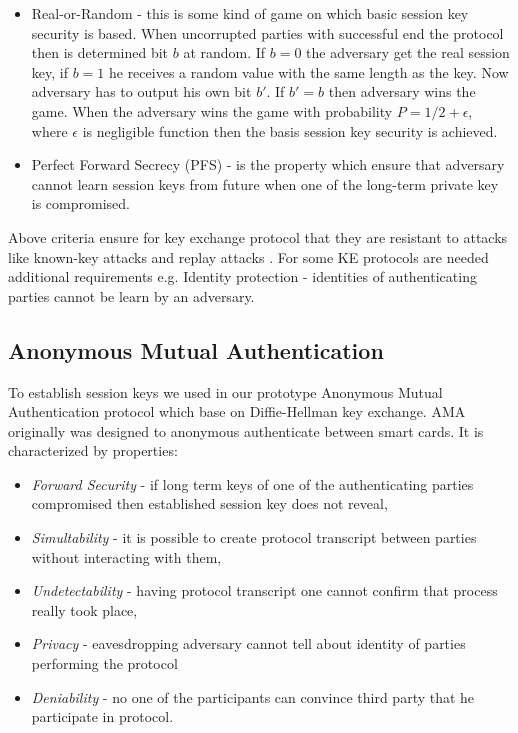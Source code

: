 \documentclass[11pt,titlepage]{article}
\theoremstyle{plain}
\begin{document}
\begin{itemize}
	\item Real-or-Random - this is some kind of game on which basic session key security is based. When uncorrupted parties with successful end the protocol then is determined bit $b$ at random. If $b=0$ the adversary get the real session key, if $b = 1$ he receives a random value with the same length as the key. Now adversary has to output his own bit $b'$. If $b' = b$ then adversary wins the game. When the adversary wins the game with probability $P = 1/2+\epsilon$, where $\epsilon$ is negligible function then the basis session key security is achieved.
	\item Perfect Forward Secrecy (PFS) - is the property which ensure that adversary cannot learn session keys from future when one of the long-term private key is compromised.
\end{itemize}

Above criteria ensure for key exchange protocol that they are resistant to attacks like known-key attacks and replay attacks \cite{cryptography}. For some KE protocols are needed additional requirements e.g. Identity protection - identities of authenticating parties cannot be learn by an adversary.


\subsection{Anonymous Mutual Authentication}
To establish session keys we used in our prototype Anonymous Mutual Authentication protocol which base on Diffie-Hellman key exchange.
AMA originally was designed to anonymous authenticate between smart cards. It is characterized by properties:
\begin{itemize}
\item \textit{Forward Security} - if long term keys of one of the authenticating parties compromised then established session key does not reveal,
\item \textit{Simultability} - it is possible to create protocol transcript between parties without interacting with them,
\item \textit{Undetectability} - having protocol transcript one cannot confirm that process really took place,
\item \textit{Privacy} - eavesdropping adversary cannot tell about identity of parties performing the protocol
\item \textit{Deniability} - no one of the participants can convince third party that he participate in protocol.
\end{itemize}
\end{document}
